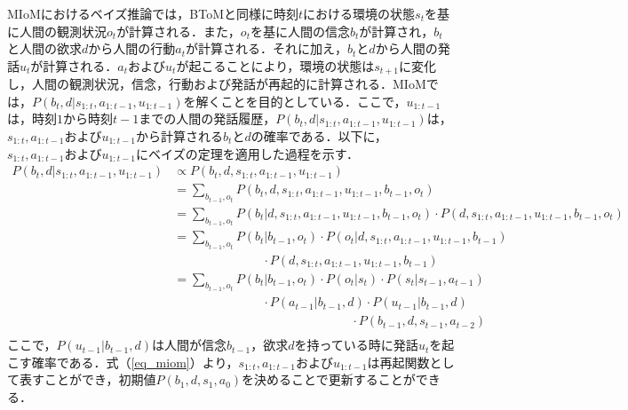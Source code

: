 MIoMにおけるベイズ推論では，BToMと同様に時刻$t$における環境の状態$s_{t}$を基に人間の観測状況$o_{t}$が計算される．また，$o_{t}$を基に人間の信念$b_{t}$が計算され，$b_{t}$と人間の欲求$d$から人間の行動$a_{t}$が計算される．それに加え，$b_t$と$d$から人間の発話$u_t$が計算される．$a_{t}$および$u_t$が起こることにより，環境の状態は$s_{t+1}$に変化し，人間の観測状況，信念，行動および発話が再起的に計算される．MIoMでは，$P(b_t,d|s_{1:t},a_{1:t-1},u_{1:t-1})$を解くことを目的としている．ここで，$u_{1:t-1}$は，時刻$1$から時刻$t-1$までの人間の発話履歴，$P(b_t,d|s_{1:t},a_{1:t-1},u_{1:t-1})$は，$s_{1:t},a_{1:t-1}およびu_{1:t-1}$から計算される$b_t$と$d$の確率である．以下に，$s_{1:t},a_{1:t-1}およびu_{1:t-1}$にベイズの定理を適用した過程を示す．
\begin{equation}
  \begin{split}
  \label{eq_miom}
  P(b_t,d|s_{1:t},a_{1:t-1},u_{1:t-1}) &\propto P(b_t,d,s_{1:t},a_{1:t-1},u_{1:t-1})\\
  &= \sum_{b_{t-1},o_t}P(b_t,d,s_{1:t},a_{1:t-1},u_{1:t-1},b_{t-1},o_t)\\
  &= \sum_{b_{t-1},o_t}P(b_t|d,s_{1:t},a_{1:t-1},u_{1:t-1},b_{t-1},o_t)\cdot P(d,s_{1:t},a_{1:t-1},u_{1:t-1},b_{t-1},o_t)\\
  &= \sum_{b_{t-1},o_t}P(b_t|b_{t-1},o_t)\cdot P(o_t|d,s_{1:t},a_{1:t-1},u_{1:t-1},b_{t-1})\\
  &\hspace{3cm} \cdot P(d,s_{1:t},a_{1:t-1},u_{1:t-1},b_{t-1})\\
  &= \sum_{b_{t-1},o_t}P(b_t|b_{t-1},o_t)\cdot P(o_t|s_t)\cdot P(s_t|s_{t-1},a_{t-1})\\
  &\hspace{3cm} \cdot P(a_{t-1}|b_{t-1},d)\cdot P(u_{t-1}|b_{t-1},d)\\
  &\hspace{6cm}\cdot P(b_{t-1},d,s_{t-1},a_{t-2})\\
  \end{split}
\end{equation}
ここで，$P(u_{t-1}|b_{t-1},d)$は人間が信念$b_{t-1}$，欲求$d$を持っている時に発話$u_t$を起こす確率である．式（\ref{eq_miom}）より，$s_{1:t},a_{1:t-1}およびu_{1:t-1}$は再起関数として表すことができ，初期値$P(b_1,d,s_1,a_0)$を決めることで更新することができる．
